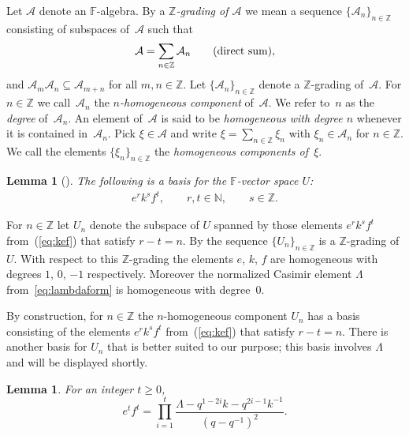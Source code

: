 \documentclass[pdftex]{sigma}
\numberwithin{equation}{section}
\newtheorem{Lemma}[Theorem]{Lemma}
\begin{document}
Let $\mathcal A$ denote an
$\mathbb F$-algebra.
By a {\it $\mathbb Z$-grading of $\mathcal A$} we mean a sequence
 $\lbrace {\mathcal A}_n \rbrace_{n\in \mathbb Z}$ consisting of
 subspaces of~$\mathcal A$
 such
that
\begin{gather*}
{\mathcal A} = \sum_{n\in \mathbb Z} \mathcal A_n
\qquad
{\mbox {\rm {(direct sum)}}},
\end{gather*}
and $\mathcal A_m \mathcal A_n \subseteq \mathcal A_{m+n}$
for all $m,n \in \mathbb Z$. Let
$\lbrace {\mathcal A}_n \rbrace_{n\in \mathbb Z}$ denote
a $\mathbb Z$-grading of~$\mathcal A$.
For $n \in \mathbb Z$
we call~$\mathcal A_n$ the {\it $n$-homogeneous component} of~$\mathcal A$.
We refer to~$n$ as the {\it degree}
of~$\mathcal A_n$.
An element of~$\mathcal A$ is
said to be {\it homogeneous with degree $n$} whenever
it is contained in~$\mathcal A_n$. Pick $\xi \in \mathcal A$
and write
$\xi = \sum\limits_{n \in \mathbb Z} \xi_n$ with
$\xi_n \in \mathcal A_n$ for $n \in \mathbb Z$.
We call the elements $\lbrace \xi_n\rbrace_{n\in \mathbb Z}$
the {\it homogeneous components of~$\xi$}.




\begin{Lemma}[]
\label{lem:efkbasis}
The following is a basis for the $\mathbb F$-vector space
$U$:
\begin{gather}
e^r k^s f^t, \qquad   r,t\in \mathbb N, \qquad  s \in \mathbb Z.
\label{eq:kef}
\end{gather}
\end{Lemma}


For $n \in \mathbb Z$ let $U_n$ denote the subspace of
$U$  spanned
by those elements
$e^r k^s f^t$ from~(\ref{eq:kef}) that satisfy
$r-t=n$.
By \cite[Section~1.9]{jantzen} the sequence
$\lbrace U_n\rbrace_{n\in \mathbb Z}$ is a $\mathbb Z$-grading
of
$U$.
With respect to this $\mathbb Z$-grading the elements
$e$, $k$, $f$ are homogeneous with degrees
$1$, $0$, $-1$ respectively. Moreover the normalized
Casimir element $\Lambda$ from~\eqref{eq:lambdaform}
is homogeneous with degree~0.


By construction,
for $n \in \mathbb Z$ the $n$-homogeneous component
$U_n$ has a basis consisting of the elements
$e^r k^s f^t$ from~(\ref{eq:kef}) that satisfy
$r-t=n$. There is another basis for
$U_n$ that is better suited to our purpose;
this basis involves $\Lambda $ and
 will be displayed shortly.


\begin{Lemma}
\label{lem:ident}
For an integer $t\geq 0$,
\[
e^t f^t = \prod_{i=1}^t \frac{\Lambda -q^{1-2i}k-q^{2i-1}k^{-1}}{(q-q^{-1})^2}.
\]
\end{Lemma}
\end{document}
